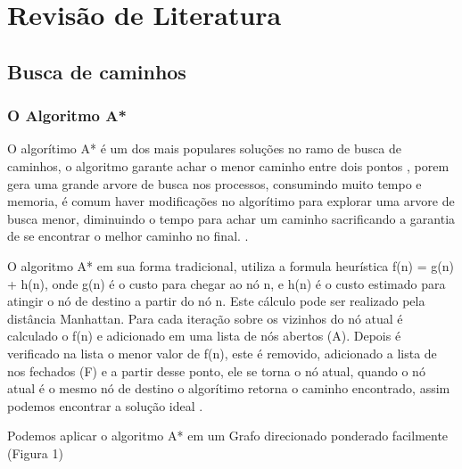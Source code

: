 \chapter[Revisão de Literatura]{Revisão de Literatura}


\section{Busca de caminhos}

\subsection{O Algoritmo A*}

O algorítimo A* é um dos mais populares soluções no ramo de busca de caminhos, o algoritmo garante achar o menor caminho entre dois pontos \cite{PEHart}, porem gera uma grande arvore de busca nos processos, consumindo muito tempo e memoria, é comum haver modificações no algorítimo para explorar uma arvore de busca menor, diminuindo o tempo para achar um caminho sacrificando a garantia de se encontrar o melhor caminho no final. \cite{Botea}.

O algoritmo A* em sua forma tradicional, utiliza a formula heurística f(n) = g(n) + h(n), onde g(n) é o custo para chegar ao nó n, e h(n) é o custo estimado para atingir o nó de destino a partir do nó n. Este cálculo pode ser realizado pela distância Manhattan. Para cada iteração sobre os vizinhos do nó atual é calculado o f(n) e adicionado em uma lista de nós abertos (A). Depois é verificado na lista o menor valor de f(n), este é removido, adicionado a lista de nos fechados (F) e a partir desse ponto, ele se torna o nó atual, quando o nó atual é o mesmo nó de destino o algorítimo retorna o caminho encontrado, assim podemos encontrar a solução ideal .

Podemos aplicar o algoritmo A* em um Grafo direcionado ponderado facilmente (Figura 1)



\begin{minipage}{\linewidth}
\end{minipage}


